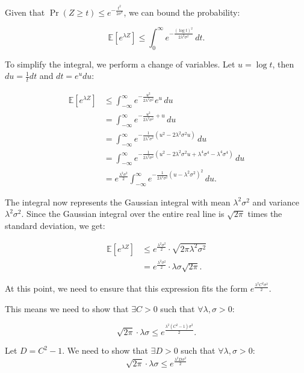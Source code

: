 \documentclass[a4 paper]{article}
\theoremstyle{boldStyle}
\theoremstyle{boldBlueStyle}
\theoremstyle{boldPurpleStyle}
\theoremstyle{boldRedStyle}
\begin{document}
Given that \(\Pr(Z \geq t) \leq e^{-\frac{t^2}{2\sigma^2}}\), we can bound the probability:

\[
\mathbb{E}[e^{\lambda Z}] \leq \int_0^\infty e^{-\frac{(\log t)^2}{2\lambda^2 \sigma^2}} \, dt.
\]

To simplify the integral, we perform a change of variables. Let \(u = \log t\), then \(du = \frac{1}{t} dt\) and \(dt = e^u du\):

\begin{align*}
\mathbb{E}[e^{\lambda Z}] &\leq \int_{-\infty}^{\infty} e^{-\frac{u^2}{2\lambda^2 \sigma^2}} e^u \, du \\
&= \int_{-\infty}^{\infty} e^{-\frac{u^2}{2\lambda^2 \sigma^2} + u} \, du \\
&= \int_{-\infty}^{\infty} e^{-\frac{1}{2\lambda^2 \sigma^2}(u^2 - 2\lambda^2 \sigma^2 u)} \, du \\
&= \int_{-\infty}^{\infty} e^{-\frac{1}{2\lambda^2 \sigma^2}\left(u^2 - 2\lambda^2 \sigma^2 u + \lambda^4 \sigma^4 - \lambda^4 \sigma^4\right)} \, du \\
&= e^{\frac{\lambda^2 \sigma^2}{2}} \int_{-\infty}^{\infty} e^{-\frac{1}{2\lambda^2 \sigma^2}(u - \lambda^2 \sigma^2)^2} \, du.
\end{align*}

The integral now represents the Gaussian integral with mean \(\lambda^2 \sigma^2\) and variance \(\lambda^2 \sigma^2\). 
Since the Gaussian integral over the entire real line is \(\sqrt{2\pi}\) times the standard deviation, we get:

\begin{align*}
\mathbb{E}[e^{\lambda Z}] &\leq e^{\frac{\lambda^2 \sigma^2}{2}} \cdot \sqrt{2\pi \lambda^2 \sigma^2} \\
&= e^{\frac{\lambda^2 \sigma^2}{2}} \cdot \lambda \sigma \sqrt{2\pi}.
\end{align*}

At this point, we need to ensure that this expression fits the form \(e^{\frac{\lambda^2 C^2 \sigma^2}{2}}\). 

This means we need to show that \(\exists C > 0\) such that \(\forall \lambda, \sigma > 0\):

\[
\sqrt{2\pi} \cdot \lambda \sigma \leq e^{\frac{\lambda^2 (C^2 - 1) \sigma^2}{2}}.
\]

Let $D = C^2 - 1$. We need to show that $\exists D > 0$ such that $\forall \lambda, \sigma > 0$:
\[
\sqrt{2\pi} \cdot \lambda \sigma \leq e^{\frac{\lambda^2 D \sigma^2}{2}}
\]
\end{document}
